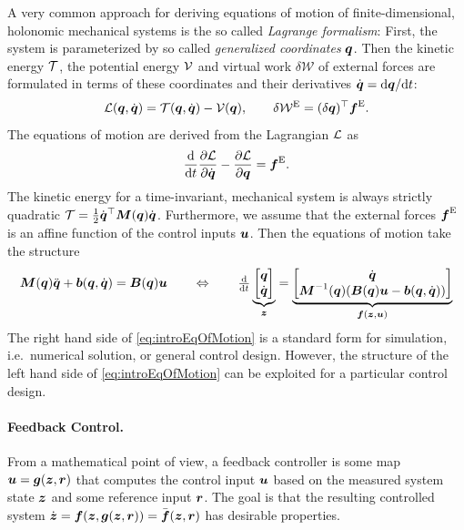 A very common approach for deriving equations of motion of finite-dimensional, holonomic mechanical systems is the so called \textit{Lagrange formalism}:
First, the system is parameterized by so called \textit{generalized coordinates} $\genCoord$.
Then the kinetic energy $\kineticEnergy$, the potential energy $\potentialEnergy$ and virtual work $\delta \mathcal{W}$ of external forces are formulated in terms of these coordinates and their derivatives $\genCoordd = \sfrac{\d \genCoord}{\d t}$:
\begin{align}
 \Lagrangian(\genCoord, \genCoordd) = \kineticEnergy(\genCoord, \genCoordd) - \potentialEnergy(\genCoord),
\qquad
 \delta\mathcal{W}^{\text{E}} = (\delta\genCoord)^\top \genForceEx.
\end{align}
The equations of motion are derived from the Lagrangian $\Lagrangian$ as
\begin{align}\label{eq:LagrangeEq}
 \diff{t} \pdiff[\Lagrangian]{\genCoordd} - \pdiff[\Lagrangian]{\genCoord} = \genForceEx.
\end{align}
The kinetic energy for a time-invariant, mechanical system is always strictly quadratic $\kineticEnergy = \tfrac{1}{2} \genCoordd^\top \sysInertiaMat(\genCoord)\genCoordd$.
Furthermore, we assume that the external forces $\genForceEx$ is an affine function of the control inputs $\sysInput$.
Then the equations of motion take the structure
\begin{align}\label{eq:introEqOfMotion}
 \sysInertiaMat(\genCoord)\genCoorddd + \sysForce(\genCoord,\genCoordd) = \sysInputMat(\genCoord) \sysInput
\qquad \Leftrightarrow \qquad
 \tdiff{t} \underbrace{\begin{bmatrix} \genCoord \\ \genCoordd \end{bmatrix}}_{\sysState}
 = \underbrace{\begin{bmatrix} \genCoordd \\ \sysInertiaMat^{-1}(\genCoord)(\sysInputMat(\genCoord) \sysInput - \sysForce(\genCoord,\genCoordd)) \end{bmatrix}}_{\tuple{f}(\sysState,\sysInput)}
\end{align}
The right hand side of \eqref{eq:introEqOfMotion} is a standard form for simulation, i.e.\ numerical solution, or general control design.
However, the structure of the left hand side of \eqref{eq:introEqOfMotion} can be exploited for a particular control design.

\paragraph{Feedback Control.}
From a mathematical point of view, a feedback controller is some map $\sysInput = \tuple{g}(\sysState,\tuple{r})$ that computes the control input $\sysInput$ based on the measured system state $\sysState$ and some reference input $\tuple{r}$.
The goal is that the resulting controlled system $\dot{\sysState} = \tuple{f}(\sysState,\tuple{g}(\sysState,\tuple{r})) = \bar{\tuple{f}}(\sysState,\tuple{r})$ has desirable properties.

